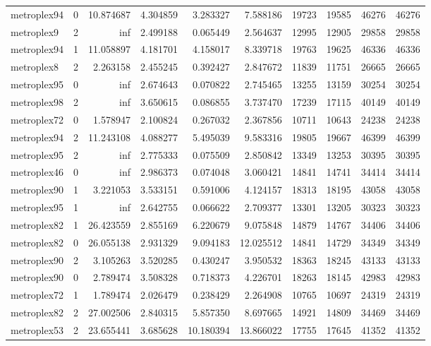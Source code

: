 \begin{longtable}{|l|r|r|r|r|r|r|r|r|r|}
metroplex94 & 0 & 10.874687 & 4.304859 & 3.283327 & 7.588186 & 19723 & 19585 & 46276 & 46276 \\
metroplex9 & 2 & inf & 2.499188 & 0.065449 & 2.564637 & 12995 & 12905 & 29858 & 29858 \\
metroplex94 & 1 & 11.058897 & 4.181701 & 4.158017 & 8.339718 & 19763 & 19625 & 46336 & 46336 \\
metroplex8 & 2 & 2.263158 & 2.455245 & 0.392427 & 2.847672 & 11839 & 11751 & 26665 & 26665 \\
metroplex95 & 0 & inf & 2.674643 & 0.070822 & 2.745465 & 13255 & 13159 & 30254 & 30254 \\
metroplex98 & 2 & inf & 3.650615 & 0.086855 & 3.737470 & 17239 & 17115 & 40149 & 40149 \\
metroplex72 & 0 & 1.578947 & 2.100824 & 0.267032 & 2.367856 & 10711 & 10643 & 24238 & 24238 \\
metroplex94 & 2 & 11.243108 & 4.088277 & 5.495039 & 9.583316 & 19805 & 19667 & 46399 & 46399 \\
metroplex95 & 2 & inf & 2.775333 & 0.075509 & 2.850842 & 13349 & 13253 & 30395 & 30395 \\
metroplex46 & 0 & inf & 2.986373 & 0.074048 & 3.060421 & 14841 & 14741 & 34414 & 34414 \\
metroplex90 & 1 & 3.221053 & 3.533151 & 0.591006 & 4.124157 & 18313 & 18195 & 43058 & 43058 \\
metroplex95 & 1 & inf & 2.642755 & 0.066622 & 2.709377 & 13301 & 13205 & 30323 & 30323 \\
metroplex82 & 1 & 26.423559 & 2.855169 & 6.220679 & 9.075848 & 14879 & 14767 & 34406 & 34406 \\
metroplex82 & 0 & 26.055138 & 2.931329 & 9.094183 & 12.025512 & 14841 & 14729 & 34349 & 34349 \\
metroplex90 & 2 & 3.105263 & 3.520285 & 0.430247 & 3.950532 & 18363 & 18245 & 43133 & 43133 \\
metroplex90 & 0 & 2.789474 & 3.508328 & 0.718373 & 4.226701 & 18263 & 18145 & 42983 & 42983 \\
metroplex72 & 1 & 1.789474 & 2.026479 & 0.238429 & 2.264908 & 10765 & 10697 & 24319 & 24319 \\
metroplex82 & 2 & 27.002506 & 2.840315 & 5.857350 & 8.697665 & 14921 & 14809 & 34469 & 34469 \\
metroplex53 & 2 & 23.655441 & 3.685628 & 10.180394 & 13.866022 & 17755 & 17645 & 41352 & 41352 \\
\end{longtable}
